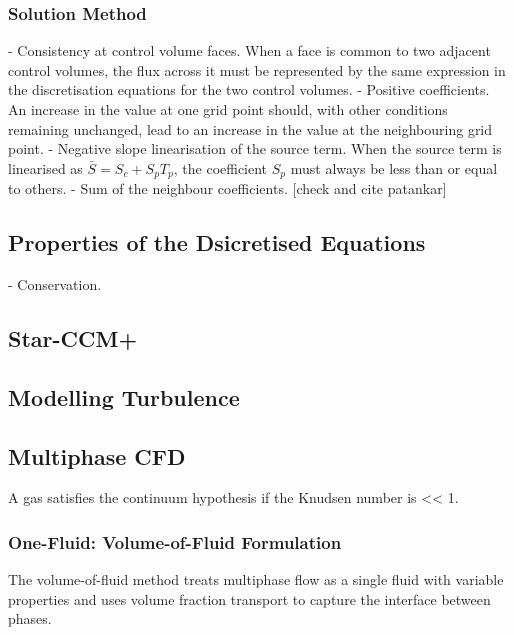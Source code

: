 \subsubsection{Solution Method}
- Consistency at control volume faces. When a face is common to two adjacent control volumes, the flux 
across it must be represented by the same expression in the discretisation equations
for the two control volumes.
- Positive coefficients. An increase in the value at one grid point should,
with other conditions remaining unchanged, lead to an increase in the value
at the neighbouring grid point.
- Negative slope linearisation of the source term. When the source
term is linearised as $\bar{S} = S_c + S_{p} T_{p}$, the coefficient $S_{p}$ must always
be less than or equal to others.
- Sum of the neighbour coefficients. [check and cite patankar]
\subsection{Properties of the Dsicretised Equations}
- Conservation. 



\subsection{Star-CCM+}
\subsection{Modelling Turbulence}
\subsection{Multiphase CFD}
A gas satisfies the continuum hypothesis if the Knudsen number  is << 1.
\subsubsection{One-Fluid: Volume-of-Fluid Formulation}
The volume-of-fluid method treats multiphase flow as a single fluid with variable properties and uses volume fraction transport to capture the interface between phases.

